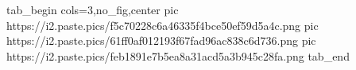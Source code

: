  
 
 
 
 


\ifcmt
  tab_begin cols=3,no_fig,center
     pic https://i2.paste.pics/f5c70228c6a46335f4bce50ef59d5a4c.png
		 pic https://i2.paste.pics/61ff0af012193f67fad96ac838c6d736.png
		 pic https://i2.paste.pics/feb1891e7b5ea8a31acd5a3b945c28fa.png
  tab_end
\fi
